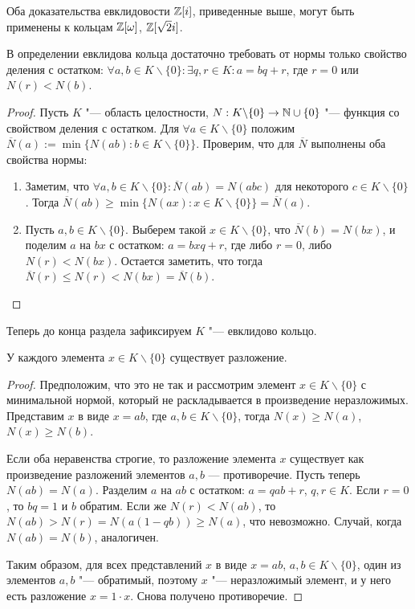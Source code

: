 \begin{note}
	Оба доказательства евклидовости $\mathbb{Z}[i]$, приведенные выше, могут быть применены к кольцам $\mathbb{Z}[\omega]$, $\mathbb{Z}[\sqrt{2}i]$.
\end{note}

\begin{proposition}
	В определении евклидова кольца достаточно требовать от нормы только свойство деления с остатком: $\forall a, b \in K\backslash\{0\}: \exists q, r \in K: a = bq + r$, где $r = 0$ или $N(r) < N(b)$.
\end{proposition}

\begin{proof}
	Пусть $K$ "--- область целостности, $N: K \backslash \{0\} \to \mathbb{N} \cup \{0\}$ "--- функция со свойством деления с остатком. Для $\forall a \in K \backslash \{0\}$ положим $\overline{N}(a) := \min\{N(ab) : b \in K \backslash \{0\}\}$. Проверим, что для $\overline{N}$ выполнены оба свойства нормы:
	\begin{enumerate}
		\item Заметим, что $\forall a, b \in K \backslash \{0\}: \overline{N}(ab) = N(abc)$ для некоторого $c \in K \backslash \{0\}$. Тогда $\overline{N}(ab) \ge \min\{N(ax) : x \in K \backslash \{0\}\} = \overline{N}(a)$.
		\item Пусть $a, b \in K \backslash \{0\}$. Выберем такой $x \in K \backslash \{0\}$, что $\overline{N}(b) = N(bx)$, и поделим $a$ на $bx$ с остатком: $a = bxq + r$, где либо $r = 0$, либо $N(r) < N(bx)$. Остается заметить, что тогда $\overline{N}(r) \le N(r) < N(bx) = \overline{N}(b)$.\qedhere
	\end{enumerate}
\end{proof}

Теперь до конца раздела зафиксируем $K$ "--- евклидово кольцо.

\begin{proposition}
	У каждого элемента $x \in K \backslash \{0\}$ существует разложение.
\end{proposition}

\begin{proof}
	Предположим, что это не так и рассмотрим элемент $x \in K \backslash \{0\}$ с минимальной нормой, который не раскладывается в произведение неразложимых. Представим $x$ в виде $x = ab$, где $a, b \in K \backslash \{0\}$, тогда $N(x) \ge N(a)$, $N(x) \ge N(b)$.
	
	Если оба неравенства строгие, то разложение элемента $x$ существует как произведение разложений элементов $a, b$ --- противоречие. Пусть теперь $N(ab) = N(a)$. Разделим $a$ на $ab$ с остатком: $a = qab + r$, $q, r \in K$. Если $r = 0$, то $bq = 1$ и $b$ обратим. Если же $N(r) < N(ab)$, то $N(ab) > N(r) = N(a(1 - qb)) \ge N(a)$, что невозможно. Случай, когда $N(ab) = N(b)$, аналогичен.
	
	Таким образом, для всех представлений $x$ в виде $x = ab$, $a, b \in K \backslash \{0\}$, один из элементов $a, b$ "--- обратимый, поэтому $x$ "--- неразложимый элемент, и у него есть разложение $x = 1 \cdot x$. Снова получено противоречие.
\end{proof}

